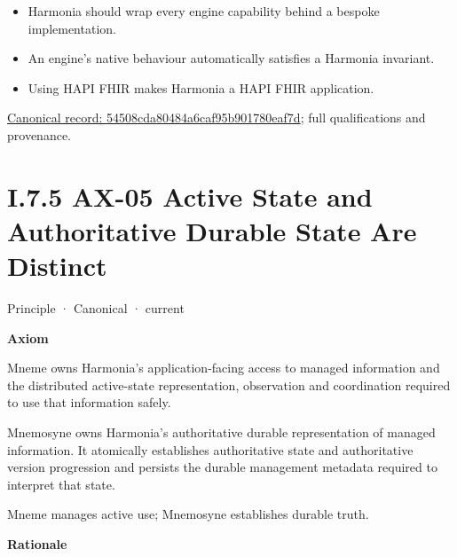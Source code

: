 \begin{itemize}


\item Harmonia should wrap every engine capability behind a bespoke implementation.

\item An engine's native behaviour automatically satisfies a Harmonia invariant.

\item Using HAPI FHIR makes Harmonia a HAPI FHIR application.

\end{itemize}

{\footnotesize \href{../../../../continuum/motivation/principle/54508cda80484a6caf95b901780eaf7d.md}{Canonical record: 54508cda80484a6caf95b901780eaf7d}; full qualifications and provenance.}\par
\section*{I.7.5 AX-05 Active State and Authoritative Durable State Are Distinct}
\label{navigation:I.7.5}

\label{element:0412a2084f0145babc4f022c71fea65f}
{\small Principle · Canonical · current}\par

\par\medskip\textbf{Axiom}\par


Mneme owns Harmonia's application-facing access to managed information
and the distributed active-state representation, observation and
coordination required to use that information safely.



Mnemosyne owns Harmonia's authoritative durable representation of
managed information. It atomically establishes authoritative state and
authoritative version progression and persists the durable management
metadata required to interpret that state.



Mneme manages active use; Mnemosyne establishes durable truth.



\par\medskip\textbf{Rationale}\par


